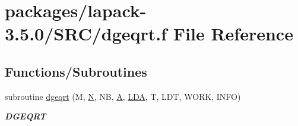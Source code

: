 \hypertarget{dgeqrt_8f}{}\section{packages/lapack-\/3.5.0/\+S\+R\+C/dgeqrt.f File Reference}
\label{dgeqrt_8f}
\subsection*{Functions/\+Subroutines}
\begin{DoxyCompactItemize}
\item 
subroutine \hyperlink{group__doubleGEcomputational_gaddcf152e87deec6123a1899f6f51101e}{dgeqrt} (M, \hyperlink{polmisc_8c_a0240ac851181b84ac374872dc5434ee4}{N}, N\+B, \hyperlink{classA}{A}, \hyperlink{example__user_8c_ae946da542ce0db94dced19b2ecefd1aa}{L\+D\+A}, T, L\+D\+T, W\+O\+R\+K, I\+N\+F\+O)
\begin{DoxyCompactList}\small\item\em {\bfseries D\+G\+E\+Q\+R\+T} \end{DoxyCompactList}\end{DoxyCompactItemize}
